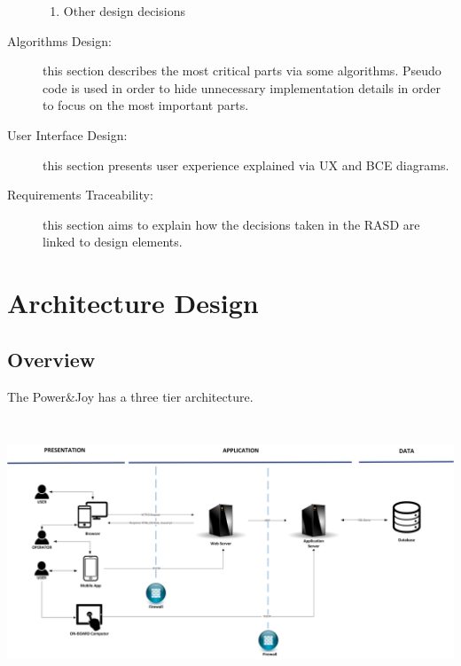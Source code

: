 \documentclass{article}
\begin{document}
\begin{flushleft}
\begin{description}
\begin {enumerate}
\item Other design decisions 
\end{enumerate}
\item  [Algorithms Design:] this section describes the most critical parts via some algorithms. Pseudo code is used in order to hide unnecessary implementation details in order to focus on the most important parts.
\item  [User Interface Design:] this section presents user experience explained via UX and BCE diagrams. 
\item  [Requirements Traceability:] this section aims to explain how the decisions taken in the RASD are linked to design elements.
\end{description}

\section{Architecture Design}  %
\subsection{Overview}  %
The Power\&Joy has a three tier architecture.
\break

\vspace{0.5cm}
\includegraphics[width=15cm, height=8cm]{architecture} 

\vspace{0.5cm}


\end{flushleft}
\end{document}
